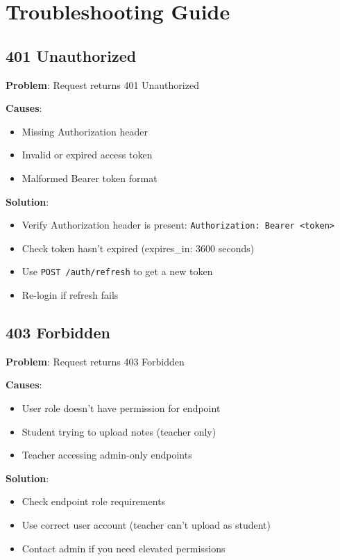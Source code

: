 \documentclass[12pt,a4paper,oneside]{article}
\begin{document}
\newpage

\section{Troubleshooting Guide}

\subsection{401 Unauthorized}

\begin{tcolorbox}[colback=lightred, colframe=darkblue]
\textbf{Problem}: Request returns 401 Unauthorized

\textbf{Causes}:
\begin{itemize}
    \item Missing Authorization header
    \item Invalid or expired access token
    \item Malformed Bearer token format
\end{itemize}

\textbf{Solution}:
\begin{itemize}
    \item Verify Authorization header is present: \texttt{Authorization: Bearer <token>}
    \item Check token hasn't expired (expires\_in: 3600 seconds)
    \item Use \texttt{POST /auth/refresh} to get a new token
    \item Re-login if refresh fails
\end{itemize}
\end{tcolorbox}

\subsection{403 Forbidden}

\begin{tcolorbox}[colback=lightred, colframe=darkblue]
\textbf{Problem}: Request returns 403 Forbidden

\textbf{Causes}:
\begin{itemize}
    \item User role doesn't have permission for endpoint
    \item Student trying to upload notes (teacher only)
    \item Teacher accessing admin-only endpoints
\end{itemize}

\textbf{Solution}:
\begin{itemize}
    \item Check endpoint role requirements
    \item Use correct user account (teacher can't upload as student)
    \item Contact admin if you need elevated permissions
\end{itemize}
\end{tcolorbox}
\end{document}
